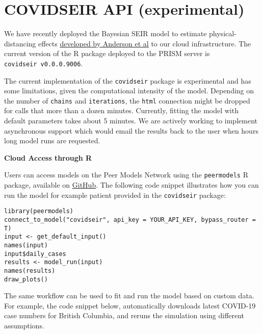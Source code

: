 \documentclass[
]{book}
\begin{document}
\hypertarget{covidseir-api-experimental}{%
\section{COVIDSEIR API (experimental)}\label{covidseir-api-experimental}}

We have recently deployed the Bayesian SEIR model to estimate physical-distancing effects \href{https://doi.org/10.1101/2020.04.17.20070086}{developed by Anderson et al} to our cloud infrastructure. The current version of the R package deployed to the PRISM server is \texttt{covidseir\ v0.0.0.9006}.

The current implementation of the \texttt{covidseir} package is experimental and has some limitations, given the computational intensity of the model. Depending on the number of \texttt{chains} and \texttt{iterations}, the \texttt{html} connection might be dropped for calls that more than a dozen minutes.
Currently, fitting the model with default parameters takes about 5 minutes. We are actively working to implement asynchronous support which would email the results back to the user when hours long model runs are requested.

\textbf{Cloud Access through R}

Users can access models on the Peer Models Network using the \texttt{peermodels} R package, available on \href{https://github.com/resplab/peermodels}{GitHub}. The following code snippet illustrates how you can run the model for example patient provided in the \texttt{covidseir} package:

\begin{verbatim}
library(peermodels)
connect_to_model("covidseir", api_key = YOUR_API_KEY, bypass_router = T)
input <- get_default_input()
names(input)
input$daily_cases
results <- model_run(input)
names(results)
draw_plots()
\end{verbatim}

The same workflow can be used to fit and run the model based on custom data. For example, the code snippet below, automatically downloads latest COVID-19 case numbers for British Columbia, and reruns the simulation using different assumptions.
\end{document}
